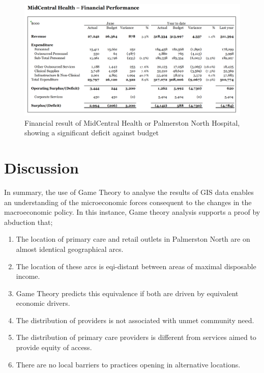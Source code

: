 \documentclass[11pt,a4paper]{article}
\begin{document}
\begin{figure}[htp]
\centering
\includegraphics[scale=0.30]{MCHbalance.png}
\caption{Financial result of MidCentral Health or Palmerston North Hospital, showing a significant deficit against budget }
\label{Financial result for MidCentral Health - Palmerston North Hospital}
\end{figure}


\pagebreak


\section{Discussion}
In summary, the use of Game Theory to analyse the results of GIS data enables an understanding of the microeconomic forces consequent to the changes in the macroeconomic policy. In this instance, Game theory analysis supports a proof by abduction that;


\begin{enumerate}
\item The location of primary care and retail outlets in Palmerston North are on almost identical geographical arcs.
\item The location of these arcs is eqi-distant between areas of maximal disposable income.
\item Game Theory predicts this equivalence if both are driven by equivalent economic drivers.
\item The distribution of providers is not associated with unmet community need.
\item The distribution of primary care providers is different from services aimed to provide equity of access.
\item There are no local barriers to practices opening in alternative locations.
\end{enumerate}
\end{document}
